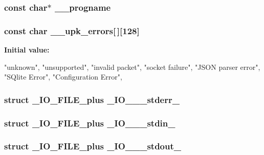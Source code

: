 \subsubsection[{\_\-\_\-progname}]{\setlength{\rightskip}{0pt plus 5cm}const char$\ast$ {\bf \_\-\_\-progname}}\label{tp_8c_af3e2558e6af14f043a37f62fee51f4b1}
\subsubsection[{\_\-\_\-upk\_\-errors}]{\setlength{\rightskip}{0pt plus 5cm}const char {\bf \_\-\_\-upk\_\-errors}[$\,$][128]\hspace{0.3cm}{\ttfamily  [static]}}\label{tp_8c_acefe2af45cf41d39ec20663163ad444b}
{\bfseries Initial value:}
\begin{DoxyCode}
 {
    "unknown",
    "unsupported",
    "invalid packet",
    "socket failure",
    "JSON parser error",
    "SQlite Error",
    "Configuration Error",
}
\end{DoxyCode}
\subsubsection[{\_\-IO\_\-2\_\-1\_\-stderr\_\-}]{\setlength{\rightskip}{0pt plus 5cm}struct \_\-IO\_\-FILE\_\-plus {\bf \_\-IO\_\_\_\-stderr\_\-}}\label{tp_8c_aea872324816db67e158fdd3b46ee9c37}
\subsubsection[{\_\-IO\_\-2\_\-1\_\-stdin\_\-}]{\setlength{\rightskip}{0pt plus 5cm}struct \_\-IO\_\-FILE\_\-plus {\bf \_\-IO\_\_\_\-stdin\_\-}}\label{tp_8c_a62eb68449a5afa9133154c8e34ddee42}
\subsubsection[{\_\-IO\_\-2\_\-1\_\-stdout\_\-}]{\setlength{\rightskip}{0pt plus 5cm}struct \_\-IO\_\-FILE\_\-plus {\bf \_\-IO\_\_\_\-stdout\_\-}}\label{tp_8c_a9b00391dd3b6feb53a40351c21ec7cb1}
